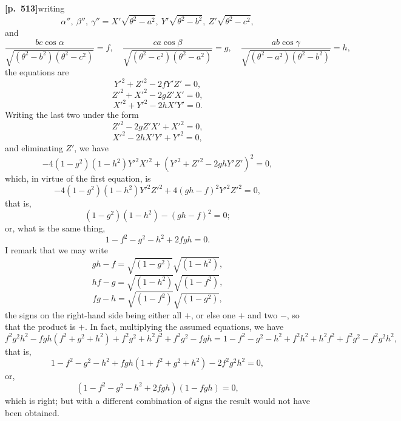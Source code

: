 \documentclass[11pt,a4paper]{article}
\begin{document}
\noindent\textbf{[p.~513]}\quad writing
\[
\alpha'',\ \beta'',\ \gamma'' = X'\sqrt{\theta^{2} - a^{2}},\ Y'\sqrt{\theta^{2} - b^{2}},\ Z'\sqrt{\theta^{2} - c^{2}},
\]
and
\[
\frac{bc\cos\alpha}{\sqrt{(\theta^{2} - b^{2})(\theta^{2} - c^{2})}} = f,\quad \frac{ca\cos\beta}{\sqrt{(\theta^{2} - c^{2})(\theta^{2} - a^{2})}} = g,\quad \frac{ab\cos\gamma}{\sqrt{(\theta^{2} - a^{2})(\theta^{2} - b^{2})}} = h,
\]
the equations are
\[
Y'^{2} + Z'^{2} - 2fY'Z' = 0,
\]
\[
Z'^{2} + X'^{2} - 2gZ'X' = 0,
\]
\[
X'^{2} + Y'^{2} - 2hX'Y' = 0.
\]
Writing the last two under the form
\[
Z'^{2} - 2gZ'X' + X'^{2} = 0,
\]
\[
X'^{2} - 2hX'Y' + Y'^{2} = 0,
\]
and eliminating $Z'$, we have
\[
-4(1 - g^{2})(1 - h^{2})Y'^{2}X'^{2} + (Y'^{2} + Z'^{2} - 2ghY'Z')^{2} = 0,
\]
which, in virtue of the first equation, is
\[
-4(1 - g^{2})(1 - h^{2})Y'^{2}Z'^{2} + 4(gh - f)^{2}Y'^{2}Z'^{2} = 0,
\]
that is,
\[
(1 - g^{2})(1 - h^{2}) - (gh - f)^{2} = 0;
\]
or, what is the same thing,
\[
1 - f^{2} - g^{2} - h^{2} + 2fgh = 0.
\]
I remark that we may write
\[
gh - f = \sqrt{(1 - g^{2})}\sqrt{(1 - h^{2})},
\]
\[
hf - g = \sqrt{(1 - h^{2})}\sqrt{(1 - f^{2})},
\]
\[
fg - h = \sqrt{(1 - f^{2})}\sqrt{(1 - g^{2})},
\]
the signs on the right-hand side being either all $+$, or else one $+$ and two $-$, so that the product is $+$. In fact, multiplying the assumed equations, we have
\[
f^{2}g^{2}h^{2} - fgh(f^{2} + g^{2} + h^{2}) + f^{2}g^{2} + h^{2}f^{2} + f^{2}g^{2} - fgh = 1 - f^{2} - g^{2} - h^{2} + f^{2}h^{2} + h^{2}f^{2} + f^{2}g^{2} - f^{2}g^{2}h^{2},
\]
that is,
\[
1 - f^{2} - g^{2} - h^{2} + fgh(1 + f^{2} + g^{2} + h^{2}) - 2f^{2}g^{2}h^{2} = 0,
\]
or,
\[
(1 - f^{2} - g^{2} - h^{2} + 2fgh)(1 - fgh) = 0,
\]
which is right; but with a different combination of signs the result would not have been obtained.
\end{document}
